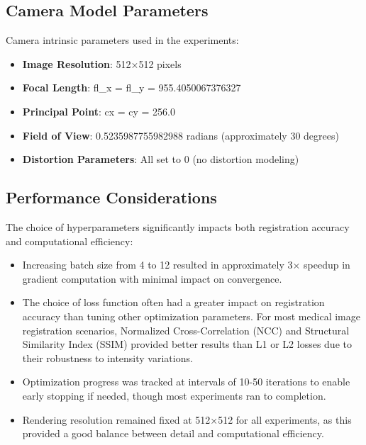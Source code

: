 \subsection{Camera Model Parameters}

Camera intrinsic parameters used in the experiments:

\begin{itemize}
    \item \textbf{Image Resolution}: 512×512 pixels
    \item \textbf{Focal Length}: fl\_x = fl\_y = 955.4050067376327
    \item \textbf{Principal Point}: cx = cy = 256.0
    \item \textbf{Field of View}: 0.5235987755982988 radians (approximately 30 degrees)
    \item \textbf{Distortion Parameters}: All set to 0 (no distortion modeling)
\end{itemize}

\subsection{Performance Considerations}

The choice of hyperparameters significantly impacts both registration accuracy and computational efficiency:

\begin{itemize}
    \item Increasing batch size from 4 to 12 resulted in approximately 3× speedup in gradient computation with minimal impact on convergence.
    
    \item The choice of loss function often had a greater impact on registration accuracy than tuning other optimization parameters. For most medical image registration scenarios, Normalized Cross-Correlation (NCC) and Structural Similarity Index (SSIM) provided better results than L1 or L2 losses due to their robustness to intensity variations.
    
    \item Optimization progress was tracked at intervals of 10-50 iterations to enable early stopping if needed, though most experiments ran to completion.
    
    \item Rendering resolution remained fixed at 512×512 for all experiments, as this provided a good balance between detail and computational efficiency.
\end{itemize}

